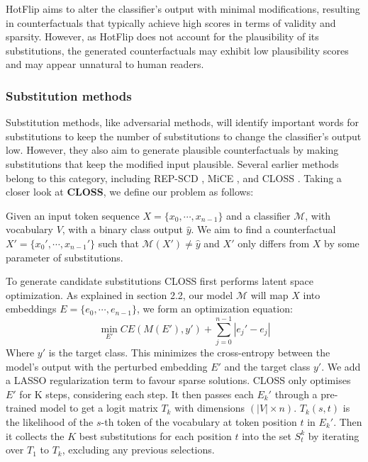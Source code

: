 HotFlip aims to alter the classifier's output with minimal modifications, resulting in counterfactuals that typically achieve high scores in terms of validity and sparsity. However, as HotFlip does not account for the plausibility of its substitutions, the generated counterfactuals may exhibit low plausibility scores and may appear unnatural to human readers.


\subsubsection{Substitution methods}
Substitution methods, like adversarial methods, will identify important words for substitutions to keep the number of substitutions to change the classifier's output low. However, they also aim to generate plausible counterfactuals by making substitutions that keep the modified input plausible. Several earlier methods belong to this category, including REP-SCD \cite{yang_generating_2020}, MiCE \cite{ross_explaining_2021}, and CLOSS \cite{pope_text_2021}.
Taking a closer look at \textbf{CLOSS}, we define our problem as follows: 

Given an input token sequence $X=\{x_0,\dotsi,x_{n-1}\}$ and a classifier $\mathcal{M}$, with vocabulary $V$, with a binary class output $\hat{y}$. We aim to find a counterfactual $X'=\{x_0',\dotsi,x_{n-1}'\}$ such that $\mathcal{M}(X') \neq \hat{y}$ and $X'$ only differs from $X$ by some parameter of substitutions.

To generate candidate substitutions CLOSS first performs latent space optimization. As explained in section 2.2, our model $\mathcal{M}$ will map $X$ into embeddings $E=\{e_0,\dotsi,e_{n-1}\}$, we form an optimization equation:
\begin{equation}
    \min_{E'} CE(M(E'),y') + \sum_{j=0}^{n-1}|e_j'-e_j|
\end{equation}
Where $y'$ is the target class. This minimizes the cross-entropy between the model's output with the perturbed embedding $E'$ and the target class $y'$. We add a LASSO regularization term to favour sparse solutions. CLOSS only optimises $E'$ for K steps, considering each step. It then passes each $E_k'$ through a pre-trained model to get a logit matrix $T_k$ with dimensions $(|V| \times n)$. $T_k(s,t)$ is the likelihood of the $s$-th token of the vocabulary at token position $t$ in $E_k'$. Then it collects the $K$ best substitutions for each position $t$ into the set $S_t^k$ by iterating over $T_1$ to $T_k$, excluding any previous selections.

